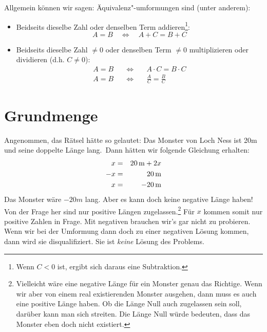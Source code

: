 \documentclass[%
11pt,%
twoside,%
titlepage,%
german,%
]{scrartcl}
\begin{document}
\begin{csatz}{}
Allgemein k\"onnen wir sagen: \"Aquivalenz"-umformungen sind (unter anderem):
\begin{itemize}
\item Beidseits dieselbe Zahl oder denselben Term addieren\footnote{Wenn $C<0$ ist, ergibt sich daraus eine Subtraktion.}:
  \begin{displaymath}
    A = B \quad\Leftrightarrow\quad A+C = B+C
  \end{displaymath}
\item Beidseits dieselbe Zahl $\neq 0$ oder denselben Term $\neq 0$ multiplizieren oder dividieren (d.h. $C \neq 0$):
  \begin{eqnarray*}
    A = B & \quad\Leftrightarrow\quad & A \cdot C = B \cdot C \\
    A = B & \quad\Leftrightarrow\quad & \frac{A}{C} = \frac{B}{C}
  \end{eqnarray*}
\end{itemize}
\end{csatz}




\section{Grundmenge}
\label{lingl:grundmenge}

Angenommen, das R\"atsel h\"atte so gelautet: \glqq Das Monster von Loch Ness ist 20\unit{m} und seine doppelte L\"ange lang.\grqq\ Dann h\"atten wir folgende Gleichung erhalten:
\begin{eqnarray*}
  x & = & \unit[20]{m}+2x \\
  -x & = & \unit[20]{m} \\
  x & = & \unit[-20]{m}
\end{eqnarray*}
Das Monster w\"are $-20\unit{m}$ lang. Aber es kann doch keine negative L\"ange haben! Von der Frage her sind nur positive L\"angen zugelassen.\footnote{Vielleicht w\"are eine negative L\"ange f\"ur ein Monster genau das Richtige. Wenn wir aber von einem real existierenden Monster ausgehen, dann muss es auch eine positive L\"ange haben. Ob die L\"ange Null auch zugelassen sein soll, dar\"uber kann man sich streiten. Die L\"ange Null w\"urde bedeuten, dass das Monster eben doch nicht existiert.} F\"ur $x$ kommen somit nur positive Zahlen in Frage. Mit negativen brauchen wir's gar nicht zu probieren. Wenn wir bei der Umformung dann doch zu einer negativen L\"osung kommen, dann wird sie disqualifiziert. Sie ist \emph{keine} L\"osung des Problems.
\end{document}
